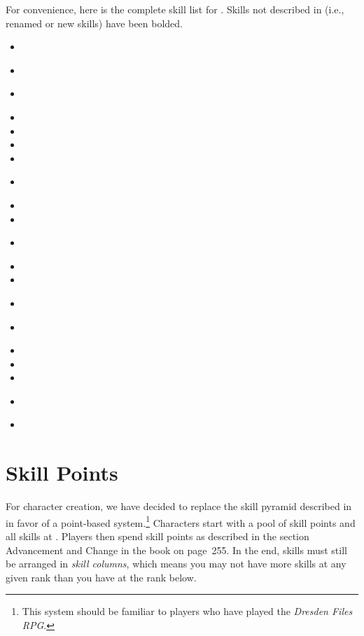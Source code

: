 \documentclass[12pt,titlepage,openany]{book}
\begin{document}
For convenience, here is the complete skill list for \StarTrekFate{}. Skills
not described in \FateCore{} (i.e., renamed or new skills) have been bolded.

\begin{multicols}{3}
    \raggedcolumns
    \begin{itemize}
        \item \textbf{}
        \item {}
        \item \textbf{}
        \item {}
        \item {}
        \item {}
        \item {}
        \item \textbf{}
        \item {}
        \item {}
        \item \textbf{}
        \item {}
        \item {}
        \item \textbf{}
        \item \textbf{}
        \item {}
        \item {}
        \item {}
        \item \textbf{}
        \item {}
    \end{itemize}
\end{multicols}

\section{Skill Points}\label{sec:skill-points}

For character creation, we have decided to replace the skill pyramid described
in \FateCore{} in favor of a point-based system.\footnote{This system should be
familiar to players who have played the \textit{Dresden Files RPG}.} Characters
start with a pool of skill points and all skills at . Players then
spend skill points as described in the section Advancement and Change in the
\FateCore{} book on page~255. In the end, skills must still be arranged in
\emph{skill columns}, which means you may not have more skills at any given
rank than you have at the rank below.
\end{document}

